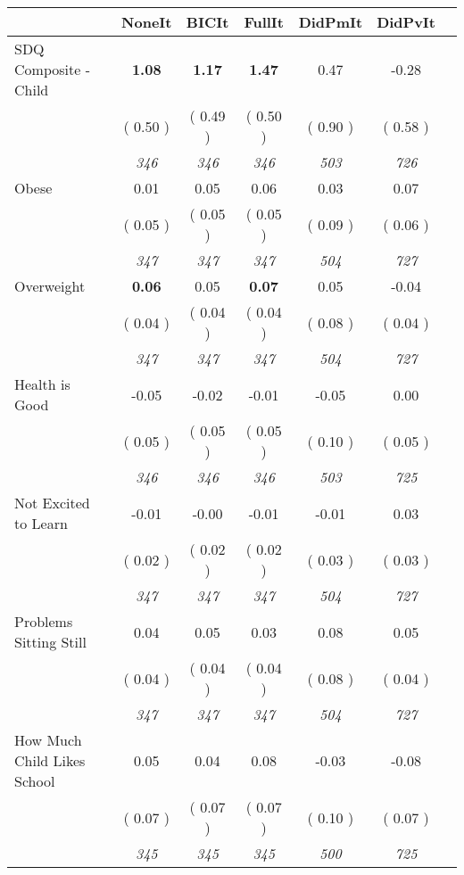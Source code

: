 \begin{tabular}{l c c c c c c}
\toprule
 & NoneIt & BICIt & FullIt & DidPmIt & DidPvIt \\
\midrule
SDQ Composite - Child & \textbf{      1.08 } & \textbf{      1.17 } & \textbf{      1.47 } &      0.47 &     -0.28 \\
& (     0.50 ) & (     0.49 ) & (     0.50 ) & (     0.90 ) & (     0.58 ) \\
& \textit{ 346 } & \textit{ 346 } & \textit{ 346 } & \textit{ 503 } & \textit{ 726 } \\
Obese &      0.01 &      0.05 &      0.06 &      0.03 &      0.07 \\
& (     0.05 ) & (     0.05 ) & (     0.05 ) & (     0.09 ) & (     0.06 ) \\
& \textit{ 347 } & \textit{ 347 } & \textit{ 347 } & \textit{ 504 } & \textit{ 727 } \\
Overweight & \textbf{      0.06 } &      0.05 & \textbf{      0.07 } &      0.05 &     -0.04 \\
& (     0.04 ) & (     0.04 ) & (     0.04 ) & (     0.08 ) & (     0.04 ) \\
& \textit{ 347 } & \textit{ 347 } & \textit{ 347 } & \textit{ 504 } & \textit{ 727 } \\
Health is Good &     -0.05 &     -0.02 &     -0.01 &     -0.05 &      0.00 \\
& (     0.05 ) & (     0.05 ) & (     0.05 ) & (     0.10 ) & (     0.05 ) \\
& \textit{ 346 } & \textit{ 346 } & \textit{ 346 } & \textit{ 503 } & \textit{ 725 } \\
Not Excited to Learn &     -0.01 &     -0.00 &     -0.01 &     -0.01 &      0.03 \\
& (     0.02 ) & (     0.02 ) & (     0.02 ) & (     0.03 ) & (     0.03 ) \\
& \textit{ 347 } & \textit{ 347 } & \textit{ 347 } & \textit{ 504 } & \textit{ 727 } \\
Problems Sitting Still &      0.04 &      0.05 &      0.03 &      0.08 &      0.05 \\
& (     0.04 ) & (     0.04 ) & (     0.04 ) & (     0.08 ) & (     0.04 ) \\
& \textit{ 347 } & \textit{ 347 } & \textit{ 347 } & \textit{ 504 } & \textit{ 727 } \\
How Much Child Likes School &      0.05 &      0.04 &      0.08 &     -0.03 &     -0.08 \\
& (     0.07 ) & (     0.07 ) & (     0.07 ) & (     0.10 ) & (     0.07 ) \\
& \textit{ 345 } & \textit{ 345 } & \textit{ 345 } & \textit{ 500 } & \textit{ 725 } \\
\bottomrule
\end{tabular}
